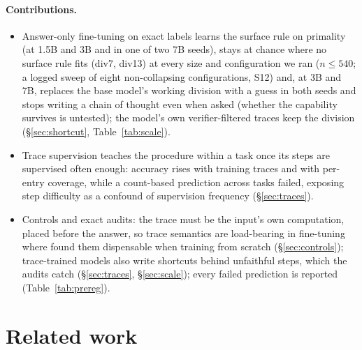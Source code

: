 \documentclass{article}
\theoremstyle{definition}
\begin{document}
\paragraph{Contributions.}
\begin{itemize}[leftmargin=*,itemsep=1pt,topsep=2pt]
\item Answer-only fine-tuning on exact labels learns the surface rule on primality (at 1.5B and 3B and in one of two 7B seeds), stays at chance where no surface rule fits (div7, div13) at every size and configuration we ran ($n\le540$; a logged sweep of eight non-collapsing configurations, S12) and, at 3B and 7B, replaces the base model's working division with a guess in both seeds and stops writing a chain of thought even when asked (whether the capability survives is untested); the model's own verifier-filtered traces keep the division (\S\ref{sec:shortcut}, Table~\ref{tab:scale}).
\item Trace supervision teaches the procedure within a task once its steps are supervised often enough: accuracy rises with training traces and with per-entry coverage, while a count-based prediction across tasks failed, exposing step difficulty as a confound of supervision frequency (\S\ref{sec:traces}).
\item Controls and exact audits: the trace must be the input's own computation, placed before the answer, so trace semantics are load-bearing in fine-tuning where \citet{valmeekam2026beyond} found them dispensable when training from scratch (\S\ref{sec:controls}); trace-trained models also write shortcuts behind unfaithful steps, which the audits catch (\S\ref{sec:traces}, \S\ref{sec:scale}); every failed prediction is reported (Table~\ref{tab:prereg}).
\end{itemize}

\section{Related work}
\end{document}

